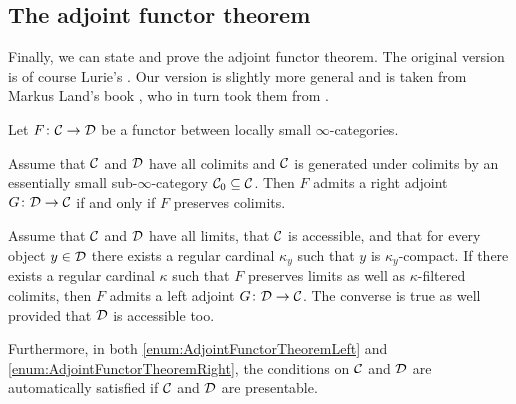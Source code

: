 \subsection{The adjoint functor theorem}\label{subsec:AdjointFunctorTheorem}
Finally, we can state and prove the adjoint functor theorem. The original version is of course Lurie's \cite[Corollary~]{HTT}. Our version is slightly more general and is taken from Markus Land's book \cite[Theorems~5.2.2 and~5.2.14]{Land}, who in turn took them from \cite{AdjointFunctorTheorems}.
\begin{satanicthm}\label{thm:AdjointFunctorTheorem}
	Let $F\colon \mathcal{C}\rightarrow\mathcal{D}$ be a functor between locally small $\infty$-categories.
	\begin{alphanumerate}
		\item Assume that $\mathcal{C}$ and $\mathcal{D}$ have all colimits and $\mathcal{C}$ is generated under colimits by an essentially small sub-$\infty$-category $\mathcal{C}_0\subseteq\mathcal{C}$. Then $F$ admits a right adjoint $G\colon \mathcal{D}\rightarrow\mathcal{C}$ if and only if $F$ preserves colimits.\label{enum:AdjointFunctorTheoremLeft}
		\item Assume that $\mathcal{C}$ and $\mathcal{D}$ have all limits, that $\mathcal{C}$ is accessible, and that for every object $y\in\mathcal{D}$ there exists a regular cardinal $\kappa_y$ such that $y$ is $\kappa_y$-compact. If there exists a regular cardinal $\kappa$ such that $F$ preserves limits as well as $\kappa$-filtered colimits, then $F$ admits a left adjoint $G\colon \mathcal{D}\rightarrow\mathcal{C}$. The converse is true as well provided that $\mathcal{D}$ is accessible too.\label{enum:AdjointFunctorTheoremRight}
	\end{alphanumerate}
	Furthermore, in both \cref{enum:AdjointFunctorTheoremLeft} and \cref{enum:AdjointFunctorTheoremRight}, the conditions on $\mathcal{C}$ and $\mathcal{D}$ are automatically satisfied if $\mathcal{C}$ and $\mathcal{D}$ are presentable.\hfill\smash{\GrothendieckRightDevil}
\end{satanicthm}


